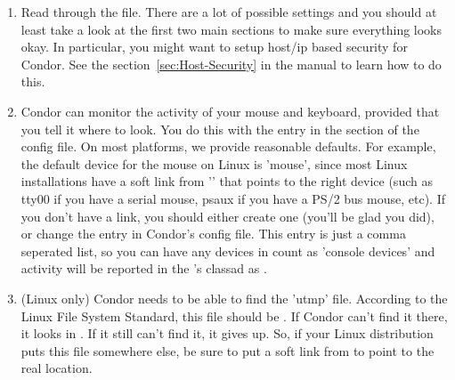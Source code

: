 \begin{enumerate}
\item  Read through the  file.  There are
    a lot of possible settings and you should at least take a look at
    the first two main sections to make sure everything looks okay.
	In particular, you might want to setup host/ip based security for
    Condor.  See the section~\ref{sec:Host-Security} in the manual
	to learn how to do this.

\item   Condor can monitor the activity of your mouse and keyboard,
    provided that you tell it where to look.  You do this with the
     entry in the  section of the config
    file.  On most platforms, we provide reasonable defaults.  For
    example, the default device for the mouse on Linux is 'mouse',
    since most Linux installations have a soft link from ''
    that points to the right device (such as tty00 if you have a
    serial mouse, psaux if you have a PS/2 bus mouse, etc).  If you
    don't have a  link, you should either create one (you'll
    be glad you did), or change the  entry in Condor's
    config file.  This entry is just a comma seperated list, so you
    can have any devices in  count as 'console devices' and
    activity will be reported in the 's classad as
    .

\item   (Linux only) Condor needs to be able to find the 'utmp' file.
    According to the Linux File System Standard, this file should be
    .  If Condor can't find it there, it looks in
    .  If it still can't find it, it gives up.  So, if
    your Linux distribution puts this file somewhere else, be sure to
    put a soft link from  to point to the real location.


\end{enumerate}
